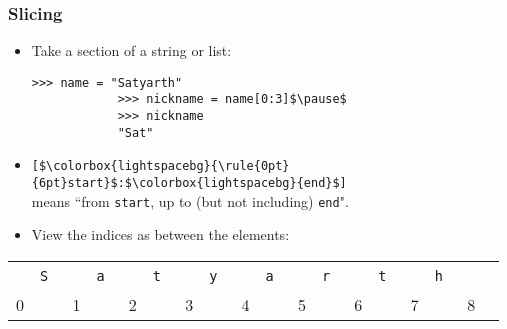 \documentclass[notes]{beamer}
\begin{document}
	\begin{frame}[fragile]
		\frametitle{Slicing}

		\begin{itemize}
			\item Take a section of a string or list:
			\begin{lstlisting}[xleftmargin=\dimexpr-\leftmargini]
			>>> name = "Satyarth"
			>>> nickname = name[0:3]$\pause$
			>>> nickname
			"Sat"
			\end{lstlisting}

			\item \lstinline|[$\colorbox{lightspacebg}{\rule{0pt}{6pt}start}$:$\colorbox{lightspacebg}{end}$]| \\
			means ``from \lstinline|start|, up to (but not including) \lstinline|end|".
			
			\item View the indices as between the elements:
		\end{itemize}
		\begin{tabular}{llllllllllllllllll}
			~ & \color{red}\tt S & ~ & \color{red}\tt a & ~ & \color{red}\tt t & ~ & \color{red}\tt y & ~ & \color{red}\tt a & ~ & \color{red}\tt r & ~ & \color{red}\tt t & ~ & \color{red}\tt h \\
			0 & ~ & 1 & ~ & 2 & ~ & 3 & ~ & 4 & ~ & 5 & ~ & 6 & ~ & 7 & ~ & 8 \\
		\end{tabular}
	\end{frame}
		
\end{document}
